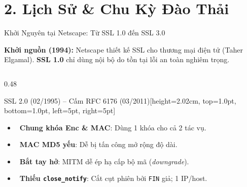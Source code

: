 \documentclass[aspectratio=169, 10pt]{beamer}
\begin{document}
\section{2. Lịch Sử \& Chu Kỳ Đào Thải}

\begin{frame}{Khởi Nguyên tại Netscape: Từ SSL 1.0 đến SSL 3.0}
	\begin{uetcard}[colback=uetaccentbg, top=1.2pt, bottom=1.2pt, left=6pt, right=6pt, sharp corners, arc=0pt]
		\fontsize{6.6pt}{7.9pt}\selectfont
		{\color{uetblue}\textbf{Khởi nguồn (1994):}} Netscape thiết kế SSL cho thương mại điện tử (Taher Elgamal). \textbf{SSL 1.0} chỉ dùng nội bộ do tồn tại lỗi an toàn nghiêm trọng.
	\end{uetcard}
	\vspace{0.03cm}

	\begin{columns}[T]
		\begin{column}{0.48\textwidth}
			\begin{accentcard}[uetblue]{SSL 2.0 (02/1995) -- Cấm RFC 6176 (03/2011)}[height=2.02cm, top=1.0pt, bottom=1.0pt, left=5pt, right=5pt]
				\setlength{\leftmargini}{9pt}
				\begin{itemize}\setlength{\itemsep}{0.1pt}\setlength{\topsep}{0pt}\fontsize{5.85pt}{6.95pt}\selectfont
					\item \xmark\ \textbf{Chung khóa Enc \& MAC}: Dùng 1 khóa cho cả 2 tác vụ.
					\item \xmark\ \textbf{MAC MD5 yếu}: Dễ bị tấn công mở rộng độ dài.
					\item \xmark\ \textbf{Bắt tay hở}: MITM dễ ép hạ cấp bộ mã (\textit{downgrade}).
					\item \xmark\ \textbf{Thiếu \texttt{close\_notify}}: Cắt cụt phiên bởi \texttt{FIN} giả; 1 IP/host.
				\end{itemize}
			\end{accentcard}
		\end{column}


\end{columns}
\end{frame}
\end{document}
